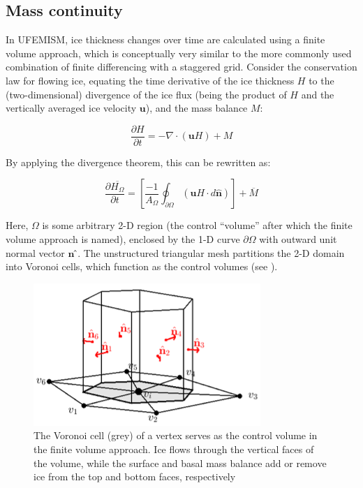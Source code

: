 \documentclass{article}
\begin{document}
\subsection{Mass continuity}

In UFEMISM, ice thickness changes over time are calculated using a finite volume approach, which is conceptually very similar to the more commonly used combination of finite differencing with a staggered grid. Consider the conservation law for flowing ice, equating the time derivative of the ice thickness $H$ to the (two-dimensional) divergence of the ice flux (being the product of $H$ and the vertically averaged ice velocity $\textbf{u}$), and the mass balance $M$:

\begin{equation} \label{iceconsvlaw}
\frac{\partial H}{\partial t} = -\nabla \cdot \left( \mathbf{u} H \right) + M
\end{equation}

By applying the divergence theorem, this can be rewritten as:

\begin{equation}
\frac{\partial \overline{H_{\Omega}}}{\partial t} = \left[ \frac{-1}{A_{\Omega}} \oint_{\partial \Omega} \left( \mathbf{u}H \cdot d\mathbf{\hat{n}} \right) \right] + \overline{M}
\end{equation}

Here, $\Omega$ is some arbitrary 2-D region (the control “volume” after which the finite volume approach is named), enclosed by the 1-D curve $\partial \Omega$ with outward unit normal vector $\textbf{\^{n}}$ ̂. The unstructured triangular mesh partitions the 2-D domain into Voronoi cells, which function as the control volumes (see ).

\begin{figure}[h!] \label{fig:masscontinuity}
  \includegraphics[width=0.3\linewidth]{Fig_masscontinuity.png}
  \caption{The Voronoi cell (grey) of a vertex serves as the control volume in the finite volume approach. Ice flows through the vertical faces of the volume, while the surface and basal mass balance add or remove ice from the top and bottom faces, respectively}
\end{figure}
\end{document}
